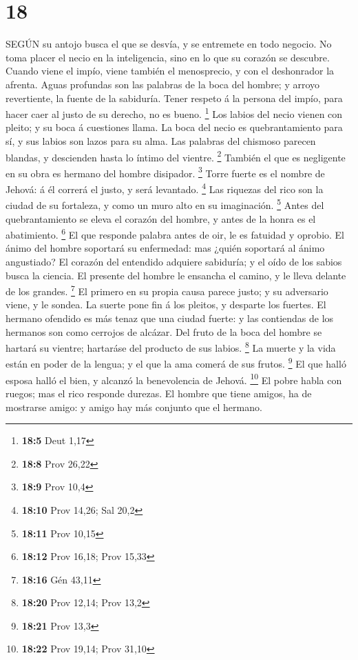 \hypertarget{section-17}{%
\section{18}\label{section-17}}

 SEGÚN su antojo busca el que se desvía, y se entremete en
todo negocio.  No toma placer el necio en la inteligencia,
sino en lo que su corazón se descubre.  Cuando viene el
impío, viene también el menosprecio, y con el deshonrador la afrenta.
 Aguas profundas son las palabras de la boca del hombre; y
arroyo revertiente, la fuente de la sabiduría.  Tener
respeto á la persona del impío, para hacer caer al justo de su derecho,
no es bueno. \footnote{\textbf{18:5} Deut 1,17}  Los labios
del necio vienen con pleito; y su boca á cuestiones llama. 
La boca del necio es quebrantamiento para sí, y sus labios son lazos
para su alma.  Las palabras del chismoso parecen blandas, y
descienden hasta lo íntimo del vientre. \footnote{\textbf{18:8} Prov
  26,22}  También el que es negligente en su obra es hermano
del hombre disipador. \footnote{\textbf{18:9} Prov 10,4} 
Torre fuerte es el nombre de Jehová: á él correrá el justo, y será
levantado. \footnote{\textbf{18:10} Prov 14,26; Sal 20,2} 
Las riquezas del rico son la ciudad de su fortaleza, y como un muro alto
en su imaginación. \footnote{\textbf{18:11} Prov 10,15} 
Antes del quebrantamiento se eleva el corazón del hombre, y antes de la
honra es el abatimiento. \footnote{\textbf{18:12} Prov 16,18; Prov 15,33}
 El que responde palabra antes de oir, le es fatuidad y
oprobio.  El ánimo del hombre soportará su enfermedad: mas
¿quién soportará al ánimo angustiado?  El corazón del
entendido adquiere sabiduría; y el oído de los sabios busca la ciencia.
 El presente del hombre le ensancha el camino, y le lleva
delante de los grandes. \footnote{\textbf{18:16} Gén 43,11}
 El primero en su propia causa parece justo; y su
adversario viene, y le sondea.  La suerte pone fin á los
pleitos, y desparte los fuertes.  El hermano ofendido es
más tenaz que una ciudad fuerte: y las contiendas de los hermanos son
como cerrojos de alcázar.  Del fruto de la boca del hombre
se hartará su vientre; hartaráse del producto de sus labios. \footnote{\textbf{18:20}
  Prov 12,14; Prov 13,2}  La muerte y la vida están en
poder de la lengua; y el que la ama comerá de sus frutos. \footnote{\textbf{18:21}
  Prov 13,3}  El que halló esposa halló el bien, y alcanzó
la benevolencia de Jehová. \footnote{\textbf{18:22} Prov 19,14; Prov
  31,10}  El pobre habla con ruegos; mas el rico responde
durezas.  El hombre que tiene amigos, ha de mostrarse
amigo: y amigo hay más conjunto que el hermano.

